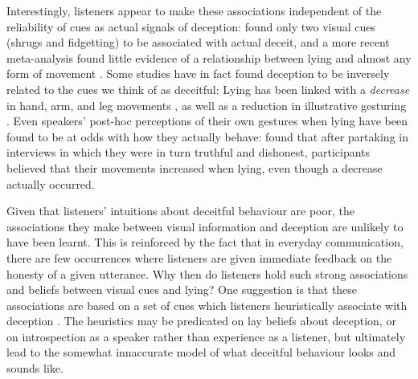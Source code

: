 \documentclass[a4paper,man,natbib]{apa6}
\begin{document}
Interestingly, listeners appear to make these associations independent of the reliability of cues as actual signals of deception: \citet{Zuckerman1981} found only two visual cues (shrugs and fidgetting) to be associated with actual deceit, and a  more recent meta-analysis found little evidence of a relationship between lying and almost any form of movement \citep{DePaulo2003}.
Some studies have in fact found deception to be inversely related to the cues we think of as deceitful:
Lying has been linked with a \emph{decrease} in hand, arm, and leg movements \citep[e.g.][]{DePaulo1992, Ekman1989, Vrij1995}, as well as a reduction in illustrative gesturing \citep[e.g.][]{DePaulo2003, Cohen2010}.
Even speakers' post-hoc perceptions of their own gestures when lying have been found to be at odds with how they actually behave:
\citet{Vrij1996} found that after partaking in interviews in which they were in turn truthful and dishonest, participants believed that their movements increased when lying, even though a decrease actually occurred.

Given that listeners' intuitions about deceitful behaviour are poor, the associations they make between visual information and deception are unlikely to have been learnt.
This is reinforced by the fact that in everyday communication, there are few occurrences where listeners are given immediate feedback on the honesty of a given utterance.
%
Why then do listeners hold such strong associations and beliefs between visual cues and lying?
%
One suggestion is that these associations are based on a set of cues which listeners heuristically associate with deception \citep{DePaulo1982}.
The heuristics may be predicated on lay beliefs about deception, or on introspection as a speaker rather than experience as a listener, but ultimately lead to the somewhat innaccurate model of what deceitful behaviour looks and sounds like. 
\end{document}

